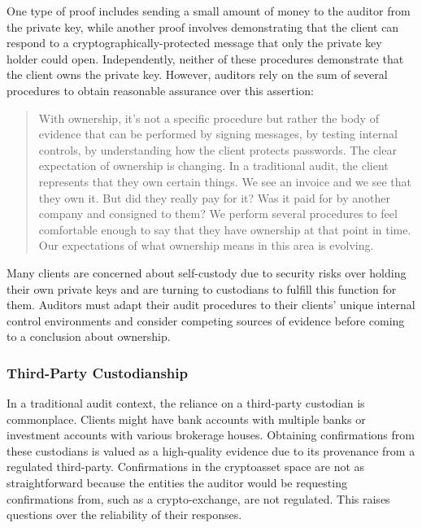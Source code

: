 One type of proof includes sending a small amount of money to the auditor from the private key, while another proof involves demonstrating that the client can respond to a cryptographically-protected message that only the private key holder could open. Independently, neither of these procedures demonstrate that the client owns the private key. However, auditors rely on the sum of several procedures to obtain reasonable assurance over this assertion: 

\begin{quote}
With ownership, it's not a specific procedure but rather the body of evidence that can be performed by signing messages, by testing internal controls, by understanding how the client protects passwords. The clear expectation of ownership is changing. In a traditional audit, the client represents that they own certain things. We see an invoice and we see that they own it. But did they really pay for it? Was it paid for by another company and consigned to them? We perform several procedures to feel comfortable enough to say that they have ownership at that point in time. Our expectations of what ownership means in this area is evolving.
\end{quote}

Many clients are concerned about self-custody due to security risks over holding their own private keys and are turning to custodians to fulfill this function for them. Auditors must adapt their audit procedures to their clients' unique internal control environments and consider competing sources of evidence before coming to a conclusion about ownership. 

\subsubsection{Third-Party Custodianship}
In a traditional audit context, the reliance on a third-party custodian is commonplace. Clients might have bank accounts with multiple banks or investment accounts with various brokerage houses. Obtaining confirmations from these custodians is valued as a high-quality evidence due to its provenance from a regulated third-party. Confirmations in the cryptoasset space are not as straightforward because the entities the auditor would be requesting confirmations from, such as a crypto-exchange, are not regulated. This raises questions over the reliability of their responses. 

